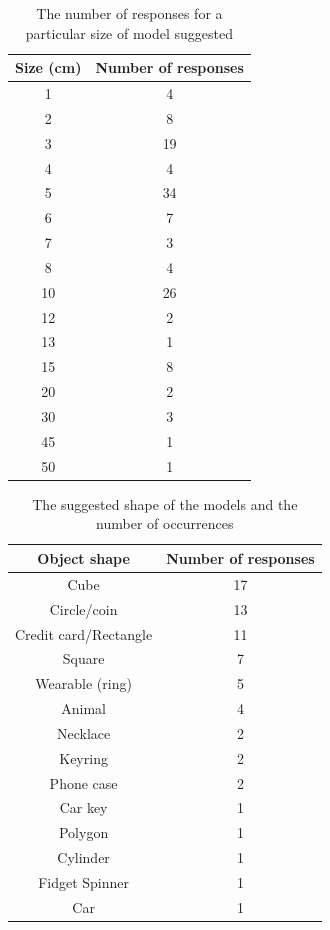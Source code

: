 \documentclass{l4proj}
\begin{document}
\begin{appendices}
\begin{table}[H]
    \centering
    \begin{tabular}{c|c}
         Size (cm) & Number of responses \\
         \midrule
         1 & 4 \\
         2 & 8 \\
         3 & 19 \\
         4 & 4 \\
         5 & 34 \\
         6 & 7 \\
         7 & 3 \\
         8 & 4 \\
         10 & 26 \\
         12 & 2 \\
         13 & 1 \\
         15 & 8 \\
         20 & 2 \\
         30 & 3 \\
         45 & 1 \\
         50 & 1
    \end{tabular}
    \caption{The number of responses for a particular size of model suggested}
    \label{tab:modsize}
\end{table}

\begin{table}[H]
    \centering
    \begin{tabular}{c|c}
         Object shape & Number of responses  \\
         \midrule
         Cube & 17 \\
         Circle/coin & 13 \\
         Credit card/Rectangle & 11 \\
         Square & 7 \\
         Wearable (ring) & 5 \\
         Animal & 4 \\
         Necklace & 2 \\
         Keyring & 2 \\
         Phone case & 2 \\
         Car key & 1 \\
         Polygon & 1 \\
         Cylinder & 1 \\
         Fidget Spinner & 1 \\
         Car & 1
    \end{tabular}
    \caption{The suggested shape of the models and the number of occurrences}
    \label{tab:modshape}
\end{table}


\end{appendices}
\end{document}
